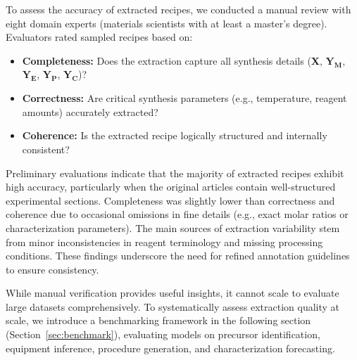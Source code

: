 To assess the accuracy of extracted recipes, we conducted a manual review with eight domain experts (materials scientists with at least a master’s degree). Evaluators rated sampled recipes based on:

\begin{itemize}
    \item \textbf{Completeness:} Does the extraction capture all synthesis details (\textbf{X}, \(\mathbf{Y_M}\), \(\mathbf{Y_E}\), \(\mathbf{Y_P}\), \(\mathbf{Y_C}\))?
    \item \textbf{Correctness:} Are critical synthesis parameters (e.g., temperature, reagent amounts) accurately extracted?
    \item \textbf{Coherence:} Is the extracted recipe logically structured and internally consistent?
\end{itemize}



Preliminary evaluations indicate that the majority of extracted recipes exhibit high accuracy, particularly when the original articles contain well-structured experimental sections. Completeness was slightly lower than correctness and coherence due to occasional omissions in fine details (e.g., exact molar ratios or characterization parameters). The main sources of extraction variability stem from minor inconsistencies in reagent terminology and missing processing conditions. These findings underscore the need for refined annotation guidelines to ensure consistency.

While manual verification provides useful insights, it cannot scale to evaluate large datasets comprehensively. To systematically assess extraction quality at scale, we introduce a benchmarking framework in the following section (Section~\ref{sec:benchmark}), evaluating models on precursor identification, equipment inference, procedure generation, and characterization forecasting.
